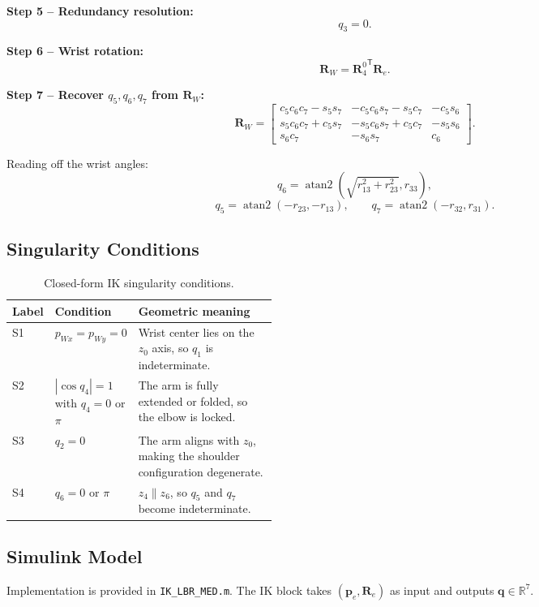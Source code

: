 \documentclass[11pt,a4paper]{article}
\newcommand{\R}{\mathbf{R}}
\newcommand{\pvec}{\mathbf{p}}
\newcommand{\qvec}{\mathbf{q}}
\newcommand{\trans}[1]{{#1}^{\mathsf{T}}}
\begin{document}
\noindent\textbf{Step 5 -- Redundancy resolution:}
\[
  q_3 = 0.
\]

\noindent\textbf{Step 6 -- Wrist rotation:}
\[
  \R_W = \trans{\R_4^0}\R_e.
\]

\noindent\textbf{Step 7 -- Recover $q_5, q_6, q_7$ from $\R_W$:}
\[
  \R_W =
  \begin{bmatrix}
    c_5 c_6 c_7 - s_5 s_7 & -c_5 c_6 s_7 - s_5 c_7 & -c_5 s_6 \\
    s_5 c_6 c_7 + c_5 s_7 & -s_5 c_6 s_7 + c_5 c_7 & -s_5 s_6 \\
    s_6 c_7 & -s_6 s_7 & c_6
  \end{bmatrix}.
\]

Reading off the wrist angles:
\[
  q_6 = \operatorname{atan2}\left(\sqrt{r_{13}^2 + r_{23}^2}, r_{33}\right),
\]
\[
  q_5 = \operatorname{atan2}(-r_{23}, -r_{13}),
  \qquad
  q_7 = \operatorname{atan2}(-r_{32}, r_{31}).
\]

\subsection{Singularity Conditions}

\begin{table}[H]
  \centering
  \caption{Closed-form IK singularity conditions.}
  \begin{tabularx}{\linewidth}{>{\raggedright\arraybackslash}p{0.10\linewidth} >{\raggedright\arraybackslash}p{0.28\linewidth} X}
    \toprule
    Label & Condition & Geometric meaning \\
    \midrule
    S1 & $p_{Wx} = p_{Wy} = 0$ & Wrist center lies on the $z_0$ axis, so $q_1$ is indeterminate. \\
    S2 & $|\cos q_4| = 1$ with $q_4 = 0$ or $\pi$ & The arm is fully extended or folded, so the elbow is locked. \\
    S3 & $q_2 = 0$ & The arm aligns with $z_0$, making the shoulder configuration degenerate. \\
    S4 & $q_6 = 0$ or $\pi$ & $z_4 \parallel z_6$, so $q_5$ and $q_7$ become indeterminate. \\
    \bottomrule
  \end{tabularx}
\end{table}

\subsection{Simulink Model}

Implementation is provided in \texttt{IK\_LBR\_MED.m}. The IK block takes $(\pvec_e, \R_e)$ as input and outputs $\qvec \in \mathbb{R}^7$.
\end{document}
